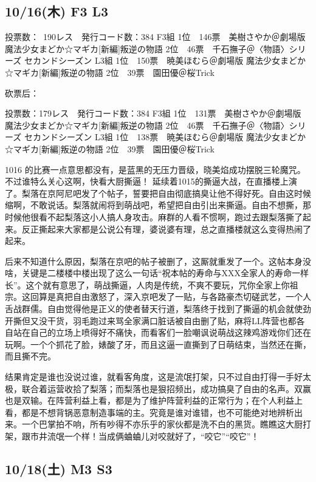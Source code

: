 \subsection{10/16(木) F3 L3}

	投票数：~190レス　発行コード数：384
	F3組
	1位　146票　美樹さやか＠劇場版 魔法少女まどか☆マギカ[新編]叛逆の物語
	2位　46票　千石撫子＠〈物語〉シリーズ セカンドシーズン
	L3組
	1位　150票　暁美ほむら＠劇場版 魔法少女まどか☆マギカ[新編]叛逆の物語
	2位　39票　園田優＠桜Trick

砍票后：

	投票数：179レス　発行コード数：384
	F3組
	1位　131票　美樹さやか＠劇場版 魔法少女まどか☆マギカ[新編]叛逆の物語
	2位　46票　千石撫子＠〈物語〉シリーズ セカンドシーズン
	L3組
	1位　138票　暁美ほむら＠劇場版 魔法少女まどか☆マギカ[新編]叛逆の物語
	2位　39票　園田優＠桜Trick

1016 的比赛一点意思都没有，是蓝黑的无压力晋级，晓美焰成功摆脱三轮魔咒。不过谁特么关心这啊，快看大厨撕逼！
延续着1015的撕逼大战，在直播楼上演了。梨落在京阿尼吧发了个帖子，誓要把自由彻底搞臭让他不得好死。自由这时候缩啊，不敢说话。梨落就闹将到萌战吧，希望把自由引出来撕逼。自由不想撕，那时候他很看不起梨落这小人搞人身攻击。麻群的人看不惯啊，跑过去跟梨落撕了起来。反正撕起来大家都是公说公有理，婆说婆有理，总之直播楼就这么变得热闹了起来。

后来不知道什么原因，梨落在京吧的帖子被删了，这厮就重发了一个。这帖本身没啥，关键是二楼楼中楼出现了这么一句话“祝本帖的寿命与XXX全家人的寿命一样长”。这个就有意思了，萌战撕逼，人肉是传统，不爽不要玩，咒你全家上你祖宗。这回算是真把自由激怒了，深入京吧发了一贴，与各路豪杰切磋武艺，一个人舌战群儒。自由觉得他是正义的使者替天行道，梨落终于找到了撕逼的机会就使劲开撕但又没干货，羽毛跑过来骂全家满口脏话被自由删了贴，麻将LL阵营也都各自站在自己的立场上喷得好不痛快，而看客们一脸嘲讽说萌战这辣鸡游戏你们还在玩啊。一个个抓花了脸，婊酸了牙，而且这逼一直撕到了日萌结束，当然还在撕，而且撕不完。

结果肯定是谁也没说过谁，就看客角度，这是流氓打架，只不过自由打得一手好太极，联合着运营收拾了梨落；而梨落也是狠招频出，成功搞臭了自由的名声。双赢也是双输。在阵营利益上看，都是为了维护阵营利益的正常行为；在个人利益上看，都是不想背锅恶意制造事端的主。究竟是谁对谁错，也不可能绝对地辨析出来。一个巴掌拍不响，所有吵得不亦乐乎的家伙都是洗不白的黑货。瞧瞧这大厨打架，跟市井流氓一个样！当成俩蛐蛐儿对咬就好了，“咬它”“咬它”！

\subsection{10/18(土) M3 S3}


